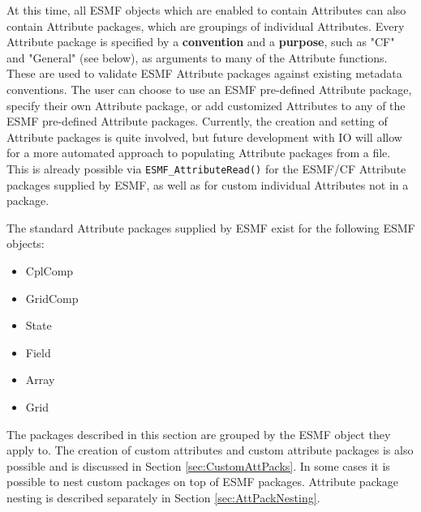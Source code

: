%


\label{sec:AttPacks}

At this time, all ESMF objects which are enabled to contain Attributes can also contain Attribute packages, which are groupings of individual Attributes.  Every Attribute package is specified by a {\bf convention} and a {\bf purpose}, such as "CF" and "General" (see below), as arguments to many of the Attribute functions.  These are used to validate ESMF Attribute packages against existing metadata conventions.  The user can choose to use an ESMF pre-defined Attribute package, specify their own Attribute package, or add customized Attributes to any of the ESMF pre-defined Attribute packages. Currently, the creation and setting of Attribute packages is quite involved, but future development with IO will allow for a more automated approach to populating Attribute packages from a file.  This is already possible via {\tt ESMF\_AttributeRead()} for the ESMF/CF Attribute packages supplied by ESMF, as well as for custom individual Attributes not in a package.

The standard Attribute packages supplied by ESMF exist for the following ESMF objects:

\begin{itemize}
    \item CplComp
    \item GridComp
    \item State
    \item Field
    \item Array
    \item Grid
\end{itemize}

The packages described in this section are grouped by the ESMF object they apply to. The creation of custom attributes and custom attribute packages is also possible and is discussed in Section \ref{sec:CustomAttPacks}. In some cases it is possible to nest custom packages on top of ESMF packages. Attribute package nesting is described separately in Section \ref{sec:AttPackNesting}.

